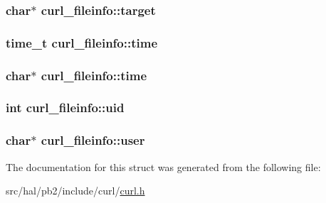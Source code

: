 \subsubsection[{\texorpdfstring{target}{target}}]{\setlength{\rightskip}{0pt plus 5cm}char$\ast$ curl\+\_\+fileinfo\+::target}\hypertarget{structcurl__fileinfo_a68e8fc68544920dc452306a79bea8907}{}\label{structcurl__fileinfo_a68e8fc68544920dc452306a79bea8907}
\subsubsection[{\texorpdfstring{time}{time}}]{\setlength{\rightskip}{0pt plus 5cm}time\+\_\+t curl\+\_\+fileinfo\+::time}\hypertarget{structcurl__fileinfo_a5136db1360519440e97f481a9a05da0f}{}\label{structcurl__fileinfo_a5136db1360519440e97f481a9a05da0f}
\subsubsection[{\texorpdfstring{time}{time}}]{\setlength{\rightskip}{0pt plus 5cm}char$\ast$ curl\+\_\+fileinfo\+::time}\hypertarget{structcurl__fileinfo_ab25d86f3b4f3c89fb924c6af136b350c}{}\label{structcurl__fileinfo_ab25d86f3b4f3c89fb924c6af136b350c}
\subsubsection[{\texorpdfstring{uid}{uid}}]{\setlength{\rightskip}{0pt plus 5cm}int curl\+\_\+fileinfo\+::uid}\hypertarget{structcurl__fileinfo_aa6fed17f82b0137397ebcb7b35c4c100}{}\label{structcurl__fileinfo_aa6fed17f82b0137397ebcb7b35c4c100}
\subsubsection[{\texorpdfstring{user}{user}}]{\setlength{\rightskip}{0pt plus 5cm}char$\ast$ curl\+\_\+fileinfo\+::user}\hypertarget{structcurl__fileinfo_af65d2a4ca6d383fcba5db89f2bf124e3}{}\label{structcurl__fileinfo_af65d2a4ca6d383fcba5db89f2bf124e3}


The documentation for this struct was generated from the following file\+:\begin{DoxyCompactItemize}
\item 
src/hal/pb2/include/curl/\hyperlink{curl_8h}{curl.\+h}\end{DoxyCompactItemize}
